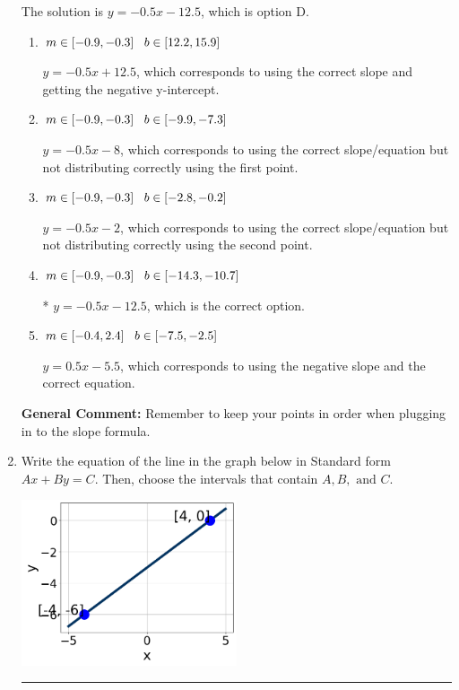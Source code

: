\documentclass{extbook}[14pt]
\newcommand{\litem}[1]{\item #1

\rule{\textwidth}{0.4pt}}
\begin{document}
\begin{enumerate}
{The solution is \( y = -0.5x -12.5 \), which is option D.\begin{enumerate}[label=\Alph*.]
\item \( m \in [-0.9, -0.3] \hspace*{3mm} b \in [12.2, 15.9] \)

 $y = -0.5x + 12.5$, which corresponds to using the correct slope and getting the negative y-intercept.
\item \( m \in [-0.9, -0.3] \hspace*{3mm} b \in [-9.9, -7.3] \)

 $y = -0.5x -8$, which corresponds to using the correct slope/equation but not distributing correctly using the first point.
\item \( m \in [-0.9, -0.3] \hspace*{3mm} b \in [-2.8, -0.2] \)

 $y = -0.5x -2$, which corresponds to using the correct slope/equation but not distributing correctly using the second point.
\item \( m \in [-0.9, -0.3] \hspace*{3mm} b \in [-14.3, -10.7] \)

* $y = -0.5x -12.5$, which is the correct option.
\item \( m \in [-0.4, 2.4] \hspace*{3mm} b \in [-7.5, -2.5] \)

 $y = 0.5x -5.5$, which corresponds to using the negative slope and the correct equation.
\end{enumerate}

\textbf{General Comment:} Remember to keep your points in order when plugging in to the slope formula.
}
\litem{
Write the equation of the line in the graph below in Standard form $Ax+By=C$. Then, choose the intervals that contain $A, B, \text{ and } C$.

\begin{center}
    \includegraphics[width=0.5\textwidth]{../Figures/linearGraphToStandardCopyA.png}
\end{center}




}
\end{enumerate}
\end{document}
